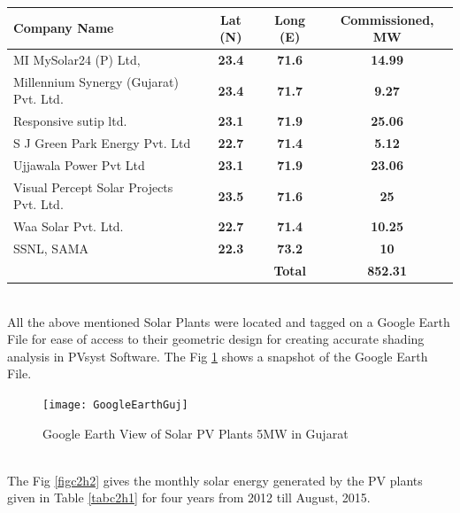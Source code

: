 \begin{table}[H]
  \centering
    \begin{tabular}{|l|c|c|c|}
    \hline
    \textbf{Company Name} & \textbf{Lat (N)} & \textbf{Long (E)} & \textbf{Commissioned, MW} \bigstrut\\
    \hline
    MI MySolar24 (P) Ltd,  & \textbf{23.4} & \textbf{71.6} & \textbf{14.99} \bigstrut\\
    \hline
    Millennium Synergy (Gujarat) Pvt. Ltd. & \textbf{23.4} & \textbf{71.7} & \textbf{9.27} \bigstrut\\
    \hline
    Responsive sutip ltd. & \textbf{23.1} & \textbf{71.9} & \textbf{25.06} \bigstrut\\
    \hline
    S J Green Park Energy Pvt. Ltd & \textbf{22.7} & \textbf{71.4} & \textbf{5.12} \bigstrut\\
    \hline
    Ujjawala Power Pvt Ltd & \textbf{23.1} & \textbf{71.9} & \textbf{23.06} \bigstrut\\
    \hline
    Visual Percept Solar Projects Pvt. Ltd. & \textbf{23.5} & \textbf{71.6} & \textbf{25} \bigstrut\\
    \hline
    Waa Solar Pvt. Ltd. & \textbf{22.7} & \textbf{71.4} & \textbf{10.25} \bigstrut\\
    \hline
    SSNL, SAMA & \textbf{22.3} & \textbf{73.2} & \textbf{10} \bigstrut\\
    \hline
       & \textbf{} & \textbf{Total} & \textbf{852.31} \bigstrut\\
    \hline
    \end{tabular}%



\end{table}
\\
All the above mentioned Solar Plants were located and tagged on a Google Earth File for ease of access to their geometric design for creating accurate shading analysis in PVsyst Software. The Fig \ref{figc2h1} shows a snapshot of the Google Earth File.
\\
\begin{figure}[H]
\centering
\texttt{[image: GoogleEarthGuj]}
\caption{Google Earth View of Solar PV Plants \geq 5MW in Gujarat}
\label{figc2h1} %
\end{figure}
\\
The Fig \ref{figc2h2} gives the monthly solar energy generated by the PV plants given in Table \ref{tabc2h1} for four years from 2012 till August, 2015.
